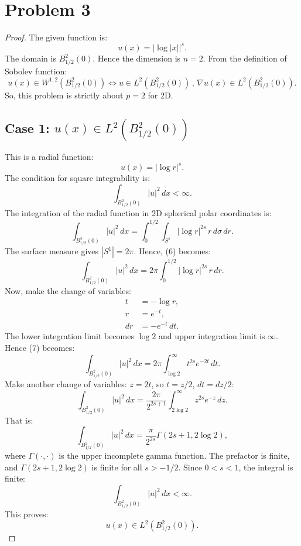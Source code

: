\section{Problem 3}
\begin{proof}
The given function is:
\[
u(x) = |\log |x||^s.
\]
The domain is $B_{1/2}^2(0)$. Hence the dimension is $n=2$. From the definition of Sobolev function:
\[
u(x)\in W^{1,2}(B_{1/2}^2(0)) \iff u\in L^2(B_{1/2}^2(0))\, ,\, \nabla u(x)\in L^2(B_{1/2}^2(0)).
\]
So, this problem is strictly about $p=2$ for 2D. 

\subsection{Case 1: $u(x)\in L^2(B_{1/2}^2(0))$}
This is a radial function:
\[
u(x)=|\log r|^s.
\]
The condition for square integrability is:
\[
\int_{B_{1/2}^2(0)} |u|^2 \, dx < \infty.
\]
The integration of the radial function in 2D spherical polar coordinates is:
\begin{equation}
    \int_{B_{1/2}^2(0)} |u|^2 \, dx = \int_0^{1/2} \int_{S^1} |\log r|^{2s} \, r \, d\sigma \, dr.
\end{equation}
The surface measure gives $|S^1|=2\pi$. Hence, (6) becomes:
\begin{equation}
    \int_{B_{1/2}^2(0)} |u|^2 \, dx = 2\pi\int_0^{1/2} |\log r|^{2s} \, r \, dr.
\end{equation}
Now, make the change of variables:
\begin{align*}
    t &= -\log r, \\
    r &= e^{-t}, \\
    dr &= -e^{-t}\, dt.
\end{align*}
The lower integration limit becomes $\log 2$ and upper integration limit is $\infty$. Hence (7) becomes:
\[
\int_{B_{1/2}^2(0)} |u|^2 \, dx = 2\pi\int_{\log 2}^\infty t^{2s}e^{-2t} \, dt.
\]
Make another change of variables: $z=2t$, so $t=z/2$, $dt=dz/2$:
\[
\int_{B_{1/2}^2(0)} |u|^2 \, dx = \frac{2\pi}{2^{2s+1}}\int_{2\log 2}^\infty z^{2s} e^{-z} \, dz.
\]
That is:
\begin{equation}
    \int_{B_{1/2}^2(0)} |u|^2 \, dx = \frac{\pi}{2^{2s}}\Gamma(2s+1, 2\log 2),
\end{equation}
where $\Gamma(\cdot,\cdot)$ is the upper incomplete gamma function. The prefactor is finite, and $\Gamma(2s+1, 2\log 2)$ is finite for all $s>-1/2$. Since $0<s<1$, the integral is finite:
\[
\int_{B_{1/2}^2(0)} |u|^2 \, dx < \infty.
\]
This proves:
\[
\boxed{u(x) \in L^2(B_{1/2}^2(0)).}
\]


\end{proof}
